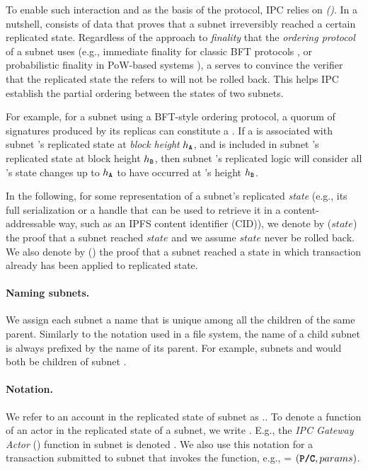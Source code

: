 To enable such interaction and as the basis of the protocol, IPC relies on  \emph{\pofsFull (\pof)}. In a nutshell, \pof consists of data that proves that a subnet irreversibly reached a certain replicated state. Regardless of the approach to \emph{finality} that the  \emph{ordering protocol} of a subnet uses  (e.g., immediate finality for classic BFT protocols \cite{}, or probabilistic finality in PoW-based systems \cite{Bitcoin}),
a \pof serves to convince the \pof verifier that the replicated state the \pof refers to will not be rolled back. This helps IPC establish the partial ordering  between the  states of two subnets. 


For example, for a subnet using a BFT-style ordering protocol, a quorum of signatures produced by its replicas can constitute a \pof.
If a \pof is associated with subnet 's replicated state at \emph{block height} $h_{\textbf{\texttt{A}}}$,
and \pof is included in subnet 's replicated state at block height $h_{\textbf{\texttt{B}}}$,
then subnet 's replicated logic will consider all 's state changes up to $h_{\textbf{\texttt{A}}}$
to have occurred at 's height $h_{\textbf{\texttt{B}}}$.

In the following, for some representation of a subnet's replicated \emph{state} (e.g., its full serialization or a handle that can be used to retrieve it in a content-addressable way, such as an IPFS content identifier (CID)),
we denote by {\pof}($state$) the proof that a subnet reached $state$ and we assume $state$  never be rolled back. 
We also denote by {\pof}() the proof that a subnet reached a state in which transaction  already has been applied to replicated state.

\paragraph{Naming subnets.}
We assign each subnet a name that is unique among all the children of the same parent.
Similarly to the notation used in a file system, the name of a child subnet is always prefixed by the name of its parent.
For example, subnets  and  would both be children of subnet .

\paragraph{Notation.} We refer to an account  in the replicated state of subnet  as ..
To denote a function of an actor in the replicated state of a subnet, we write .
E.g., the \emph{IPC Gateway Actor} (\gw) function  in subnet  is denoted .
We also use this notation for a transaction  submitted to subnet  that invokes the function, e.g.,  = $(\textbf{\texttt{P/C}}, params)$.

